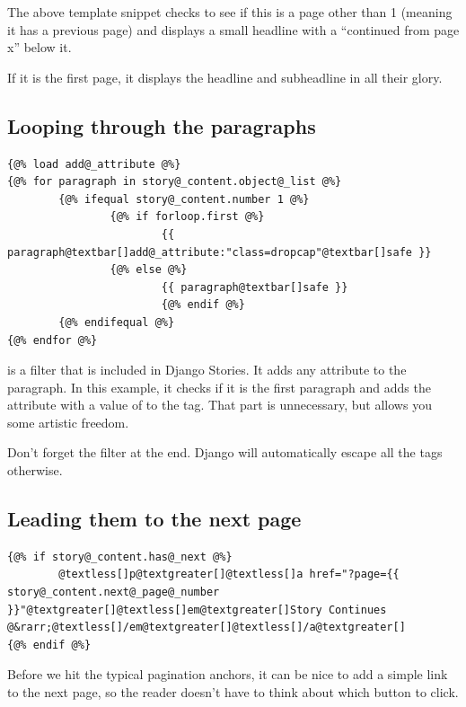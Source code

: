 \documentclass[letterpaper,10pt,english]{manual}
\begin{document}
The above template snippet checks to see if this is a page other than 1 (meaning it has a previous page) and displays a small headline with a ``continued from page x'' below it.

If it is the first page, it displays the headline and subheadline in all their glory.


\subsection{Looping through the paragraphs}

\begin{Verbatim}[commandchars=@\[\]]
{@% load add@_attribute @%}
{@% for paragraph in story@_content.object@_list @%}
        {@% ifequal story@_content.number 1 @%}
                {@% if forloop.first @%}
                        {{ paragraph@textbar[]add@_attribute:"class=dropcap"@textbar[]safe }}
                {@% else @%}
                        {{ paragraph@textbar[]safe }}
                        {@% endif @%}
        {@% endifequal @%}
{@% endfor @%}
\end{Verbatim}

 is a filter that is included in Django Stories. It adds any attribute to the paragraph. In this example, it checks if it is the first paragraph and adds the attribute  with a value of  to the  tag. That part is unnecessary, but allows you some artistic freedom.

Don't forget the  filter at the end. Django will automatically escape all the tags otherwise.


\subsection{Leading them to the next page}

\begin{Verbatim}[commandchars=@\[\]]
{@% if story@_content.has@_next @%}
        @textless[]p@textgreater[]@textless[]a href="?page={{ story@_content.next@_page@_number }}"@textgreater[]@textless[]em@textgreater[]Story Continues @&rarr;@textless[]/em@textgreater[]@textless[]/a@textgreater[]
{@% endif @%}
\end{Verbatim}

Before we hit the typical pagination anchors, it can be nice to add a simple link to the next page, so the reader doesn't have to think about which button to click.
\end{document}
